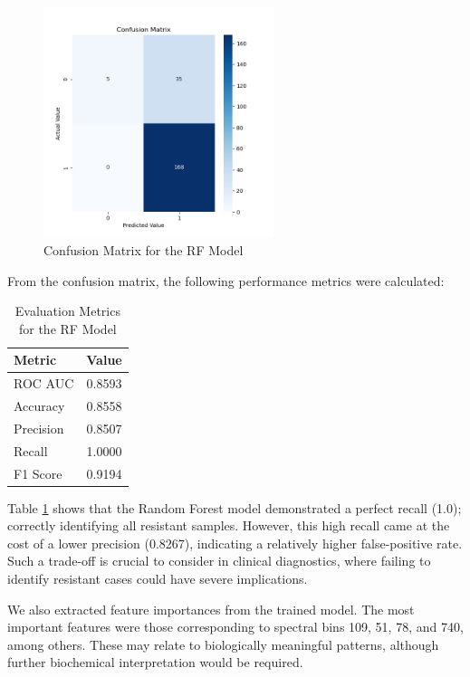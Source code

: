 \documentclass{article}
\begin{document}
\begin{figure}[h]
  \centering
  \includegraphics[width=0.6\textwidth]{confusion_matrix_Random_Forest.png}
  \caption{Confusion Matrix for the RF Model}
  \label{fig:rf_confusion_matrix}
\end{figure}

From the confusion matrix, the following performance metrics were calculated:

\begin{table}[h]
\centering
\caption{Evaluation Metrics for the RF Model}
\label{tab:Random Forest Performance Metrics}
\begin{tabular}{|l|c|}
\hline
\textbf{Metric} & \textbf{Value} \\
\hline
ROC AUC   & 0.8593 \\
Accuracy  & 0.8558 \\
Precision & 0.8507 \\
Recall    & 1.0000 \\
F1 Score  & 0.9194 \\
\bottomrule
\end{tabular}
\end{table}

Table \ref{tab:Random Forest Performance Metrics} shows that the Random Forest model demonstrated a perfect recall (1.0); correctly identifying all resistant samples. However, this high recall came at the cost of a lower precision (0.8267), indicating a relatively higher false-positive rate. Such a trade-off is crucial to consider in clinical diagnostics, where failing to identify resistant cases could have severe implications.

We also extracted feature importances from the trained model. The most important features were those corresponding to spectral bins 109, 51, 78, and 740, among others. These may relate to biologically meaningful patterns, although further biochemical interpretation would be required.
\end{document}
